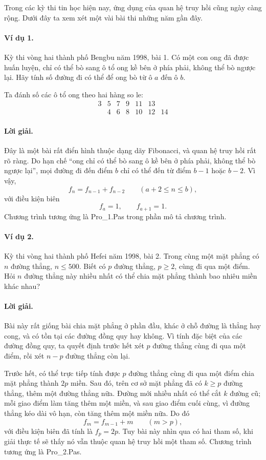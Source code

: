 \documentclass[11pt]{article}
\begin{document}
Trong các kỳ thi tin học hiện nay, ứng dụng của quan hệ truy hồi cũng ngày
càng rộng. Dưới đây ta xem xét một vài bài thi những năm gần đây.

\paragraph{Ví dụ 1.}
Kỳ thi vòng hai thành phố Bengbu năm 1998, bài 1. Có một con ong đã được huấn
luyện, chỉ có thể bò sang ô tổ ong kề bên ở phía phải, không thể bò ngược
lại. Hãy tính số đường đi có thể để ong bò từ ô \(a\) đến ô \(b\).

Ta đánh số các ô tổ ong theo hai hàng so le:
\[
\begin{array}{ccccccc}
3&5&7&9&11&13&\\
&4&6&8&10&12&14
\end{array}
\]

\paragraph{Lời giải.}
Đây là một bài rất điển hình thuộc dạng dãy Fibonacci, và quan hệ truy hồi
rất rõ ràng. Do hạn chế ``ong chỉ có thể bò sang ô kề bên ở phía phải, không
thể bò ngược lại'', mọi đường đi đến điểm \(b\) chỉ có thể đến từ điểm
\(b-1\) hoặc \(b-2\). Vì vậy,
\[
  f_n=f_{n-1}+f_{n-2}\qquad (a+2\le n\le b),
\]
với điều kiện biên
\[
  f_a=1,\qquad f_{a+1}=1.
\]
Chương trình tương ứng là Pro\_1.Pas trong phần mô tả chương trình.

\paragraph{Ví dụ 2.}
Kỳ thi vòng hai thành phố Hefei năm 1998, bài 2. Trong cùng một mặt phẳng có
\(n\) đường thẳng, \(n\le500\). Biết có \(p\) đường thẳng, \(p\ge2\), cùng
đi qua một điểm. Hỏi \(n\) đường thẳng này nhiều nhất có thể chia mặt phẳng
thành bao nhiêu miền khác nhau?

\paragraph{Lời giải.}
Bài này rất giống bài chia mặt phẳng ở phần đầu, khác ở chỗ đường là thẳng
hay cong, và có tồn tại các đường đồng quy hay không. Vì tính đặc biệt của
các đường đồng quy, ta quyết định trước hết xét \(p\) đường thẳng cùng đi qua
một điểm, rồi xét \(n-p\) đường thẳng còn lại.

Trước hết, có thể trực tiếp tính được \(p\) đường thẳng cùng đi qua một điểm
chia mặt phẳng thành \(2p\) miền. Sau đó, trên cơ sở mặt phẳng đã có
\(k\ge p\) đường thẳng, thêm một đường thẳng nữa. Đường mới nhiều nhất có thể
cắt \(k\) đường cũ; mỗi giao điểm làm tăng thêm một miền, và sau giao điểm
cuối cùng, vì đường thẳng kéo dài vô hạn, còn tăng thêm một miền nữa. Do đó
\[
  f_m=f_{m-1}+m\qquad (m>p),
\]
với điều kiện biên đã tính là \(f_p=2p\). Tuy bài này nhìn qua có hai tham
số, khi giải thực tế sẽ thấy nó vẫn thuộc quan hệ truy hồi một tham số.
Chương trình tương ứng là Pro\_2.Pas.
\end{document}
